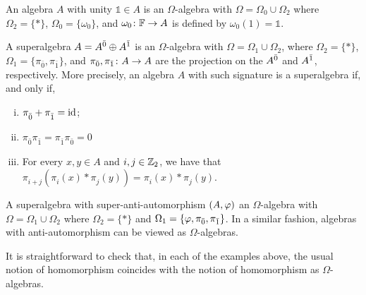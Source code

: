 \begin{ex}
    An algebra $A$ with unity $\mathds{1} \in A$ is an  $\Omega$-algebra with $\Omega = \Omega_0 \cup \Omega_2$ where $\Omega_2 = \{ * \}$, $\Omega_0 = \{ \omega_0 \}$, and $\omega_0\colon \mathbb{F} \to A$ is defined by $\omega_0 (1) = \mathds 1$.
\end{ex}

\begin{ex}\label{ex:omega-alg-SA}
    A superalgebra $A = A^{\bar0} \oplus A^{\bar1}$ is an $\Omega$-algebra with $\Omega = \Omega_1 \cup \Omega_2$, where $\Omega_2 = \{ * \}$, $\Omega_1 = \{ \pi_{\bar 0}, \pi_{\bar 1} \}$, and $\pi_{\bar 0}, \pi_{\bar 1}\colon A \to A$ are the projection on the $A^{\bar0}$ and $A^{\bar1}$, respectively. 
    More precisely, an algebra $A$ with such signature is a superalgebra if, and only if,
    \begin{enumerate}[(i)]
        \item $\pi_{\bar 0}^{} + \pi_{\bar 1}^{} = \operatorname{id}$; \label{item:sum-projections}
        \item $\pi_{\bar 0}^{}\pi_{\bar 1}^{} = \pi_{\bar 1}^{}\pi_{\bar 0}^{} = 0$
        \item For every $x,y \in A$ and $i, j\in \mathbb{Z}_2$, we have that $\pi_{i+j}^{}( \pi_i^{} (x)*\pi_j^{} (y) ) = \pi_i^{} (x)*\pi_j^{} (y)$.
    \end{enumerate}
\end{ex}


\begin{ex}
    A superalgebra with super-anti-automorphism $(A, \varphi)$ an $\Omega$-algebra with $\Omega = \Omega_1 \cup \Omega_2$ where $\Omega_2 = \{ * \}$ and $\Omega_1 = \{ \varphi, \pi_{\bar 0}, \pi_{\bar 1} \}$. 
    In a similar fashion, algebras with anti-automorphism can be viewed as $\Omega$-algebras.
\end{ex}

It is straightforward to check that, in each of the examples above, the usual notion of homomorphism coincides with the notion of homomorphism as $\Omega$-algebras.

